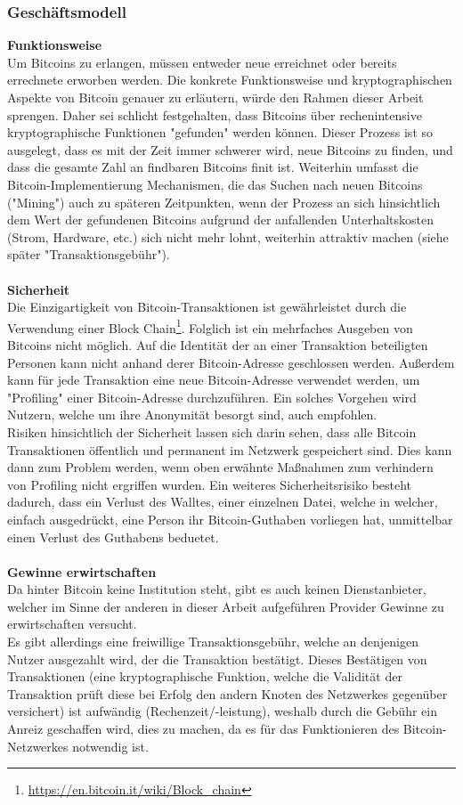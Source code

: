 \subsubsection{Geschäftsmodell}
\textbf{Funktionsweise}\\
Um Bitcoins zu erlangen, müssen entweder neue erreichnet oder bereits errechnete erworben werden. Die konkrete Funktionsweise und kryptographischen Aspekte von Bitcoin genauer zu erläutern, würde den Rahmen dieser Arbeit sprengen. Daher sei schlicht festgehalten, dass Bitcoins über rechenintensive kryptographische Funktionen "gefunden" werden können. Dieser Prozess ist so ausgelegt, dass es mit der Zeit immer schwerer wird, neue Bitcoins zu finden, und dass die gesamte Zahl an findbaren Bitcoins finit ist. Weiterhin umfasst die Bitcoin-Implementierung Mechanismen, die das Suchen nach neuen Bitcoins ("Mining") auch zu späteren Zeitpunkten, wenn der Prozess an sich hinsichtlich dem Wert der gefundenen Bitcoins aufgrund der anfallenden Unterhaltskosten (Strom, Hardware, etc.) sich nicht mehr lohnt, weiterhin attraktiv machen (siehe später "Transaktionsgebühr").\\
\\
\textbf{Sicherheit}\\
Die Einzigartigkeit von Bitcoin-Transaktionen ist gewährleistet durch die Verwendung einer Block Chain\footnote{\url{https://en.bitcoin.it/wiki/Block\_chain}}. Folglich ist ein mehrfaches Ausgeben von Bitcoins nicht möglich. Auf die Identität der an einer Transaktion beteiligten Personen kann nicht anhand derer Bitcoin-Adresse geschlossen werden. Außerdem kann für jede Transaktion eine neue Bitcoin-Adresse verwendet werden, um "Profiling" einer Bitcoin-Adresse durchzuführen. Ein solches Vorgehen wird Nutzern, welche um ihre Anonymität besorgt sind, auch empfohlen.\\
Risiken hinsichtlich der Sicherheit lassen sich darin sehen, dass alle Bitcoin Transaktionen öffentlich und permanent im Netzwerk gespeichert sind. Dies kann dann zum Problem werden, wenn oben erwähnte Maßnahmen zum verhindern von Profiling nicht ergriffen wurden. Ein weiteres Sicherheitsrisiko besteht dadurch, dass ein Verlust des Walltes, einer einzelnen Datei, welche in welcher, einfach ausgedrückt, eine Person ihr Bitcoin-Guthaben vorliegen hat, unmittelbar einen Verlust des Guthabens beduetet.\\
\\
\textbf{Gewinne erwirtschaften}\\
Da hinter Bitcoin keine Institution steht, gibt es auch keinen Dienstanbieter, welcher im Sinne der anderen in dieser Arbeit aufgeführen Provider Gewinne zu erwirtschaften versucht.\\
Es gibt allerdings eine freiwillige Transaktionsgebühr, welche an denjenigen Nutzer ausgezahlt wird, der die Transaktion bestätigt. Dieses Bestätigen von Transaktionen (eine kryptographische Funktion, welche die Validität der Transaktion prüft diese bei Erfolg den andern Knoten des Netzwerkes gegenüber versichert) ist aufwändig (Rechenzeit/-leistung), weshalb durch die Gebühr ein Anreiz geschaffen wird, dies zu machen, da es für das Funktionieren des Bitcoin-Netzwerkes notwendig ist.

